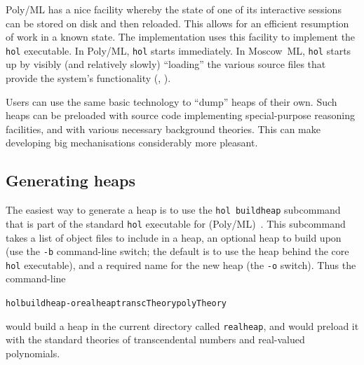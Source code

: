 Poly/ML has a nice facility whereby the state of one of its interactive sessions can be stored on disk and then reloaded.
This allows for an efficient resumption of work in a known state.
The \HOL{} implementation uses this facility to implement the \texttt{hol} executable.
In Poly/ML, \texttt{hol} starts immediately.
In Moscow~ML, \texttt{hol} starts up by visibly (and relatively slowly) ``loading'' the various source files that provide the system's functionality (\eg, ).

Users can use the same basic technology to ``dump'' heaps of their own.
Such heaps can be preloaded with source code implementing special-purpose reasoning facilities, and with various necessary background theories.
This can make developing big mechanisations considerably more pleasant.

\subsection{\texorpdfstring{Generating \HOL{} heaps}{Generating HOL heaps}}

The easiest way to generate a \HOL{} heap is to use the \texttt{hol buildheap} subcommand that is part of the standard \texttt{hol} executable for (Poly/ML)~\HOL.
This subcommand takes a list of object files to include in a heap, an optional heap to build upon (use the \texttt{-b} command-line switch; the default is to use the heap behind the core \texttt{hol} executable), and a required name for the new heap (the \texttt{-o} switch).
Thus the command-line
\begin{alltt}
   hol buildheap -o realheap transcTheory polyTheory
\end{alltt}
would build a heap in the current directory called \texttt{realheap}, and would preload it with the standard theories of transcendental numbers and real-valued polynomials.

